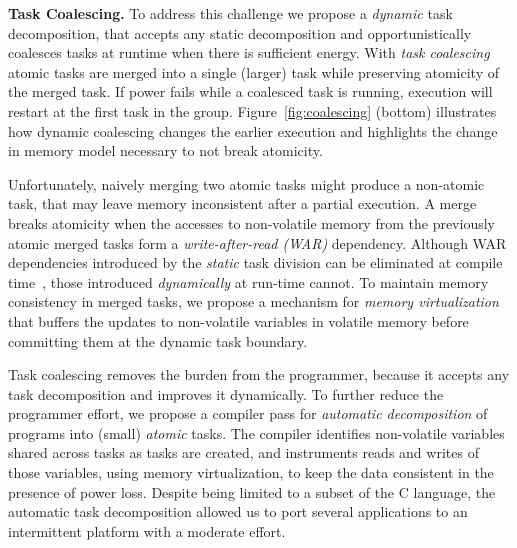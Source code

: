 \textbf{Task Coalescing.} To address this challenge we propose a \emph{dynamic} task decomposition, that accepts any static decomposition and opportunistically coalesces tasks at runtime when there is sufficient energy. With \emph{task coalescing} atomic tasks are merged into a single (larger) task while preserving atomicity of the merged task. If power fails while a coalesced task is running, execution will restart at the first task in the group. Figure~\ref{fig:coalescing} (bottom) illustrates how dynamic coalescing changes the earlier execution and highlights the change in memory model necessary to not break atomicity.

Unfortunately, naively merging two atomic tasks might produce a non-atomic task, that may leave memory inconsistent after a partial execution. A merge breaks atomicity when the accesses to non-volatile memory from the previously atomic merged tasks form a \emph{write-after-read (WAR)} dependency.
%
%
Although WAR dependencies introduced by the \emph{static} task division can be eliminated at compile time~\cite{alpaca}, those introduced \emph{dynamically} at
run-time cannot. To maintain memory consistency in merged tasks, we propose a
mechanism for \emph{memory virtualization} that buffers the updates to non-volatile variables in volatile memory before committing them at the dynamic task boundary.
%

Task coalescing removes the burden from the programmer, because it accepts any task decomposition and improves it dynamically. To further reduce the programmer effort, we propose a compiler pass for \emph{automatic decomposition} of programs into (small) \emph{atomic} tasks. The compiler identifies non-volatile variables shared across tasks as tasks are created, and instruments reads and writes of those variables, using memory virtualization, to keep the data consistent in the presence of power loss. Despite being limited to a subset of the C language, the automatic task decomposition allowed us to port several
applications to an intermittent platform with a moderate effort.

